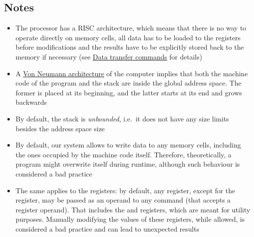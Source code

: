 \subsection{Notes}

\begin{itemize}
    \item The  processor has a RISC architecture,
    which means that there is no way to operate directly on memory cells,
    all data has to be loaded to the registers before modifications and
    the results have to be explicitly stored back to the memory if necessary
    (see \hyperlink{cmd:data_transfer}{Data transfer commands} for details)

    \item A \href{https://en.wikipedia.org/wiki/Von_Neumann_architecture}
    {Von Neumann architecture} of the  computer implies that
    both the machine code of the program and the stack are inside the
    global address space.
    The former is placed at its beginning, and the latter starts at its end
    and grows backwards

    \item By default, the stack is \textit{unbounded}, i.e.\ it does not
    have any size limits besides the address space size

    \item By default, our system allows to write data to any memory cells,
    including the ones occupied by the machine code itself.
    Therefore, theoretically, a program might overwrite itself during runtime,
    although such behaviour is considered a bad practice

    \item The same applies to the registers: by default, any register,
    except for the  register, may be passed as an operand to any
    command (that accepts a register operand).
    That includes the  and  registers, which are meant
    for utility purposes.
    Manually modifying the values of these registers, while allowed,
    is considered a bad practice and can lead to unexpected results
\end{itemize}
